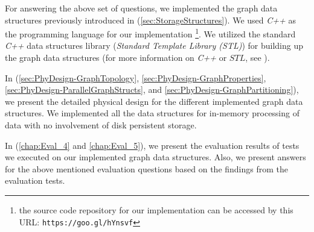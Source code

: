 {\begin{enumerate}
\end{enumerate}

For answering the above set of questions, we implemented the graph data structures previously introduced in (\ref{sec:StorageStructures}). We used \textit{C++} as the programming language for our implementation \footnote{the source code repository for our implementation can be accessed by this URL: \texttt{https://goo.gl/hYnsvf}}. We utilized the standard \textit{C++} data structures library (\textit{Standard Template Library (STL)}) for building up the graph data structures (for more information on \textit{C++} or $STL$, see \cite{josuttis2012c++}). 

In (\ref{sec:PhyDesign-GraphTopology}, \ref{sec:PhyDesign-GraphProperties}, \ref{sec:PhyDesign-ParallelGraphStructs}, and \ref{sec:PhyDesign-GraphPartitioning}), we present the detailed physical design for the different implemented graph data structures. We implemented all the data structures for in-memory processing of data with no involvement of disk persistent storage. 

In (\ref{chap:Eval_4} and \ref{chap:Eval_5}), we present the evaluation results of tests we executed on our implemented graph data structures. Also, we present answers for the above mentioned evaluation questions based on the findings from the evaluation tests.


}
